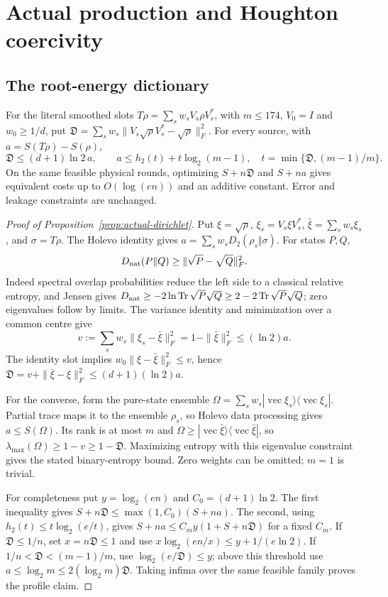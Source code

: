 \section{Actual production and Houghton coercivity}
\label{app:houghton-coercivity}

\subsection{The root-energy dictionary}

\begin{proposition}\label{prop:actual-dirichlet}
For the literal smoothed slots $T\rho=\sum_sw_sV_s\rho V_s^*$,
with $m\leq174$, $V_0=I$ and $w_0\geq1/d$, put
$\mathfrak D=\sum_sw_s\|V_s\sqrt\rho V_s^*-\sqrt\rho\|_F^2$.
For every source, with $a=S(T\rho)-S(\rho)$,
\[
 \mathfrak D\leq(d+1)\ln2\,a,\qquad
 a\leq h_2(t)+t\log_2(m-1),\quad
 t=\min\{\mathfrak D,(m-1)/m\}.
\]
On the same feasible physical rounds, optimizing $S+n\mathfrak D$
and $S+na$ gives equivalent costs up to $O(\log(en))$ and an
additive constant. Error and leakage constraints are unchanged.
\end{proposition}

\begin{proof}[Proof of Proposition~\ref{prop:actual-dirichlet}]
Put $\xi=\sqrt\rho$, $\xi_s=V_s\xi V_s^*$,
$\bar\xi=\sum_sw_s\xi_s$, and $\sigma=T\rho$.
The Holevo identity gives $a=\sum_sw_sD_2(\rho_s\Vert\sigma)$.
For states $P,Q$,
\[
 D_{\rm nat}(P\Vert Q)\geq\|\sqrt P-\sqrt Q\|_F^2.
\]
Indeed spectral overlap probabilities reduce the left side to a
classical relative entropy, and Jensen gives
$D_{\rm nat}\geq-2\ln\operatorname{Tr}\sqrt P\sqrt Q
\geq2-2\operatorname{Tr}\sqrt P\sqrt Q$; zero eigenvalues follow by limits.
The variance identity and minimization over a common centre give
\[
 v:=\sum_sw_s\|\xi_s-\bar\xi\|_F^2
     =1-\|\bar\xi\|_F^2\leq(\ln2)a.
\]
The identity slot implies $w_0\|\xi-\bar\xi\|_F^2\leq v$, hence
$\mathfrak D=v+\|\bar\xi-\xi\|_F^2\leq(d+1)(\ln2)a$.

For the converse, form the pure-state ensemble
$\Omega=\sum_sw_s|\operatorname{vec}\xi_s\rangle
\langle\operatorname{vec}\xi_s|$. Partial trace maps it to the
ensemble $\rho_s$, so Holevo data processing gives $a\leq S(\Omega)$.
Its rank is at most $m$ and
$\Omega\geq|\operatorname{vec}\bar\xi\rangle
\langle\operatorname{vec}\bar\xi|$, so
$\lambda_{\max}(\Omega)\geq1-v\geq1-\mathfrak D$.
Maximizing entropy with this eigenvalue constraint gives the stated
binary-entropy bound. Zero weights can be omitted; $m=1$ is trivial.

For completeness put $y=\log_2(en)$ and $C_0=(d+1)\ln2$.
The first inequality gives
$S+n\mathfrak D\leq\max(1,C_0)(S+na)$.
The second, using $h_2(t)\leq t\log_2(e/t)$, gives
$S+na\leq C_m y(1+S+n\mathfrak D)$ for a fixed $C_m$.
If $\mathfrak D\leq1/n$, set $x=n\mathfrak D\leq1$ and use
$x\log_2(en/x)\leq y+1/(e\ln2)$.
If $1/n<\mathfrak D<(m-1)/m$, use
$\log_2(e/\mathfrak D)\leq y$; above this threshold use
$a\leq\log_2m\leq2(\log_2m)\mathfrak D$.
Taking infima over the same feasible family proves the profile claim.
\end{proof}

